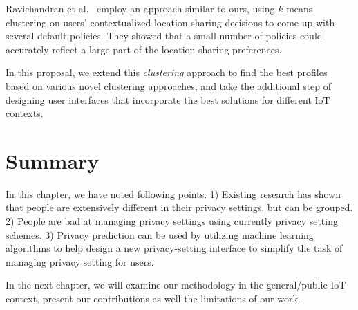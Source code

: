 Ravichandran et al.~\cite{ravichandran2009capturing} employ an approach similar to ours, using $k$-means clustering on users' contextualized location sharing decisions to come up with several default policies. They showed that a small number of policies could accurately reflect a large part of the location sharing preferences. 

In this proposal, we extend this \emph{clustering} approach to find the best profiles based on various novel clustering approaches, and take the additional step of designing user interfaces that incorporate the best solutions for different IoT contexts.

\section{Summary}
In this chapter, we have noted following points: 1) Existing research has shown that people are extensively different in their privacy settings, but can be grouped. 2) People are bad at managing privacy settings using currently privacy setting schemes. 3) Privacy prediction can be used by utilizing machine learning algorithms to help design a new privacy-setting interface to simplify the task of managing privacy setting for users. 

In the next chapter, we will examine our methodology in the general/public IoT context, present our contributions as well the limitations of our work.
